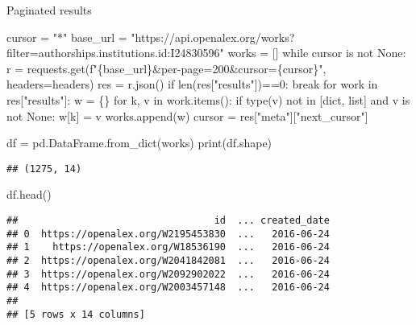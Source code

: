 \documentclass[
  10pt,
  ignorenonframetext,
  aspectratio=169]{beamer}
\newenvironment{Shaded}{\begin{snugshade}}{\end{snugshade}}
\newcommand{\BuiltInTok}[1]{\textcolor[rgb]{0.80,0.80,0.80}{#1}}
\newcommand{\ControlFlowTok}[1]{\textcolor[rgb]{0.94,0.87,0.69}{#1}}
\newcommand{\DecValTok}[1]{\textcolor[rgb]{0.86,0.86,0.80}{#1}}
\newcommand{\KeywordTok}[1]{\textcolor[rgb]{0.94,0.87,0.69}{#1}}
\newcommand{\NormalTok}[1]{\textcolor[rgb]{0.80,0.80,0.80}{#1}}
\newcommand{\OperatorTok}[1]{\textcolor[rgb]{0.94,0.94,0.82}{#1}}
\newcommand{\SpecialCharTok}[1]{\textcolor[rgb]{0.86,0.64,0.64}{#1}}
\newcommand{\SpecialStringTok}[1]{\textcolor[rgb]{0.80,0.58,0.58}{#1}}
\newcommand{\StringTok}[1]{\textcolor[rgb]{0.80,0.58,0.58}{#1}}
\newcommand{\VariableTok}[1]{\textcolor[rgb]{0.80,0.80,0.80}{#1}}
\begin{document}
\begin{frame}[fragile]{Paginated results}
\protect\hypertarget{paginated-results-2}{}
\scriptsize

\begin{Shaded}
\begin{Highlighting}[]
\NormalTok{cursor }\OperatorTok{=} \StringTok{"*"}
\NormalTok{base\_url }\OperatorTok{=} \StringTok{"https://api.openalex.org/works?filter=authorships.institutions.id:I24830596"}
\NormalTok{works }\OperatorTok{=}\NormalTok{ []}
\ControlFlowTok{while}\NormalTok{ cursor }\KeywordTok{is} \KeywordTok{not} \VariableTok{None}\NormalTok{:}
\NormalTok{    r }\OperatorTok{=}\NormalTok{ requests.get(}\SpecialStringTok{f"}\SpecialCharTok{\{}\NormalTok{base\_url}\SpecialCharTok{\}}\SpecialStringTok{\&per{-}page=200\&cursor=}\SpecialCharTok{\{}\NormalTok{cursor}\SpecialCharTok{\}}\SpecialStringTok{"}\NormalTok{, headers}\OperatorTok{=}\NormalTok{headers)}
\NormalTok{    res }\OperatorTok{=}\NormalTok{ r.json()}
    \ControlFlowTok{if} \BuiltInTok{len}\NormalTok{(res[}\StringTok{"results"}\NormalTok{])}\OperatorTok{==}\DecValTok{0}\NormalTok{:}
        \ControlFlowTok{break}
    \ControlFlowTok{for}\NormalTok{ work }\KeywordTok{in}\NormalTok{ res[}\StringTok{"results"}\NormalTok{]:}
\NormalTok{        w }\OperatorTok{=}\NormalTok{ \{\}}
        \ControlFlowTok{for}\NormalTok{ k, v }\KeywordTok{in}\NormalTok{ work.items():}
            \ControlFlowTok{if} \BuiltInTok{type}\NormalTok{(v) }\KeywordTok{not} \KeywordTok{in}\NormalTok{ [}\BuiltInTok{dict}\NormalTok{, }\BuiltInTok{list}\NormalTok{] }\KeywordTok{and}\NormalTok{ v }\KeywordTok{is} \KeywordTok{not} \VariableTok{None}\NormalTok{:}
\NormalTok{                w[k] }\OperatorTok{=}\NormalTok{ v}
\NormalTok{        works.append(w)}
\NormalTok{    cursor }\OperatorTok{=}\NormalTok{ res[}\StringTok{"meta"}\NormalTok{][}\StringTok{"next\_cursor"}\NormalTok{]}
    
\NormalTok{df }\OperatorTok{=}\NormalTok{ pd.DataFrame.from\_dict(works)}
\BuiltInTok{print}\NormalTok{(df.shape)}
\end{Highlighting}
\end{Shaded}

\begin{verbatim}
## (1275, 14)
\end{verbatim}

\begin{Shaded}
\begin{Highlighting}[]
\NormalTok{df.head()}
\end{Highlighting}
\end{Shaded}

\begin{verbatim}
##                                  id  ... created_date
## 0  https://openalex.org/W2195453830  ...   2016-06-24
## 1    https://openalex.org/W18536190  ...   2016-06-24
## 2  https://openalex.org/W2041842081  ...   2016-06-24
## 3  https://openalex.org/W2092902022  ...   2016-06-24
## 4  https://openalex.org/W2003457148  ...   2016-06-24
## 
## [5 rows x 14 columns]
\end{verbatim}
\end{frame}
\end{document}
